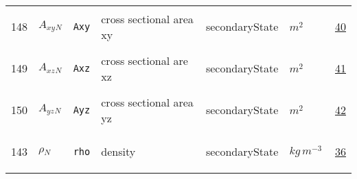 \begin{longtable}{|p{1cm}|p{2.5cm}|p{4.5cm}|p{8cm}|p{3.0cm}|p{3cm}|p{1cm}|}
            148
             & \hypertarget{"v:148"}{ $ {{A_{xy}}}{_{N}} $}
             & \verb|Axy|
             & cross sectional area xy
             & \begin{lay}secondaryState \end{lay}
             & $ m^{2} \, $
             &                 \hyperlink{"e:40"}{ 40 }
                 \\
            149
             & \hypertarget{"v:149"}{ $ {{A_{xz}}}{_{N}} $}
             & \verb|Axz|
             & cross sectional are xz
             & \begin{lay}secondaryState \end{lay}
             & $ m^{2} \, $
             &                 \hyperlink{"e:41"}{ 41 }
                 \\
            150
             & \hypertarget{"v:150"}{ $ {{A_{yz}}}{_{N}} $}
             & \verb|Ayz|
             & cross sectional area yz
             & \begin{lay}secondaryState \end{lay}
             & $ m^{2} \, $
             &                 \hyperlink{"e:42"}{ 42 }
                 \\
            143
             & \hypertarget{"v:143"}{ $ {{\rho}}{_{N}} $}
             & \verb|rho|
             & density
             & \begin{lay}secondaryState \end{lay}
             & $ kg \,m^{-3} \, $
             &                 \hyperlink{"e:36"}{ 36 }
                 \\
    \end{longtable}